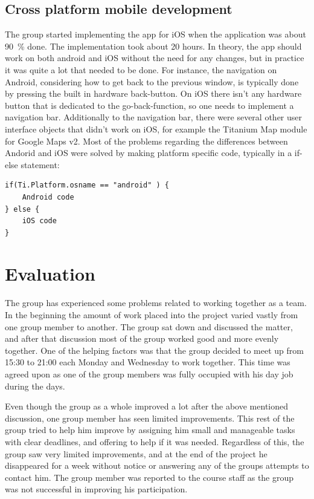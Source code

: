 \documentclass[11pt]{book}
\begin{document}
\section{Cross platform mobile development}
The group started implementing the app for iOS when the application was about 90~\% done. The implementation took about 20 hours. In theory, the app should work on both android and iOS without the need for any changes, but in practice it was quite a lot that needed to be done. For instance, the navigation on Android, considering how to get back to the previous window, is typically done by pressing the built in hardware back-button. On iOS there isn’t any hardware button that is dedicated to the go-back-function, so one needs to implement a navigation bar. Additionally to the navigation bar, there were several other user interface objects that didn’t work on iOS, for example the Titanium Map module for Google Maps v2. Most of the problems regarding the differences between Andorid and iOS were solved by making platform specific code, typically in a if-else statement:

\begin{lstlisting}[frame=single]
if(Ti.Platform.osname == "android" ) {
    Android code
} else {
    iOS code
}
\end{lstlisting}
\chapter{Evaluation}
The group has experienced some problems related to working together as a team. In the beginning the amount of work placed into the project varied vastly from one group member to another. The group sat down and discussed the matter, and after that discussion most of the group worked good and more evenly together. One of the helping factors was that the group decided to meet up from 15:30 to 21:00 each Monday and Wednesday to work together. This time was agreed upon as one of the group members was fully occupied with his day job during the days.

Even though the group as a whole improved a lot after the above mentioned discussion, one group member has seen limited improvements. This rest of the group tried to help him improve by assigning him small and manageable tasks with clear deadlines, and offering to help if it was needed. Regardless of this, the group saw very limited improvements, and at the end of the project he disappeared for a week without notice or answering any of the groups attempts to contact him. The group member was reported to the course staff as the group was not successful in improving his participation.
\end{document}

